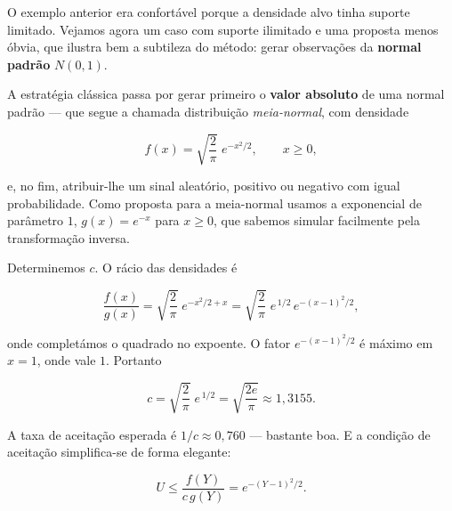 \documentclass[
  portuguese,
  11pt,
  openany]{book}
\begin{document}
O exemplo anterior era confortável porque a densidade alvo tinha suporte
limitado. Vejamos agora um caso com suporte ilimitado e uma proposta menos
óbvia, que ilustra bem a subtileza do método: gerar observações da \textbf{normal
padrão} \(N(0,1)\).

A estratégia clássica passa por gerar primeiro o \textbf{valor absoluto} de uma
normal padrão --- que segue a chamada distribuição \emph{meia-normal}, com densidade

\[
f(x) = \sqrt{\frac{2}{\pi}}\; e^{-x^2/2}, \qquad x \geq 0,
\]

e, no fim, atribuir-lhe um sinal aleatório, positivo ou negativo com igual
probabilidade. Como proposta para a meia-normal usamos a exponencial de
parâmetro \(1\), \(g(x) = e^{-x}\) para \(x \geq 0\), que sabemos simular facilmente
pela transformação inversa.

Determinemos \(c\). O rácio das densidades é

\[
\frac{f(x)}{g(x)} = \sqrt{\frac{2}{\pi}}\; e^{-x^2/2 + x}
= \sqrt{\frac{2}{\pi}}\; e^{\,1/2}\, e^{-(x-1)^2/2},
\]

onde completámos o quadrado no expoente. O fator \(e^{-(x-1)^2/2}\) é máximo em
\(x = 1\), onde vale \(1\). Portanto

\[
c = \sqrt{\frac{2}{\pi}}\; e^{\,1/2} = \sqrt{\frac{2e}{\pi}} \approx 1{,}3155.
\]

A taxa de aceitação esperada é \(1/c \approx 0{,}760\) --- bastante boa. E a
condição de aceitação simplifica-se de forma elegante:

\[
U \leq \frac{f(Y)}{c\,g(Y)} = e^{-(Y-1)^2/2}.
\]
\end{document}
